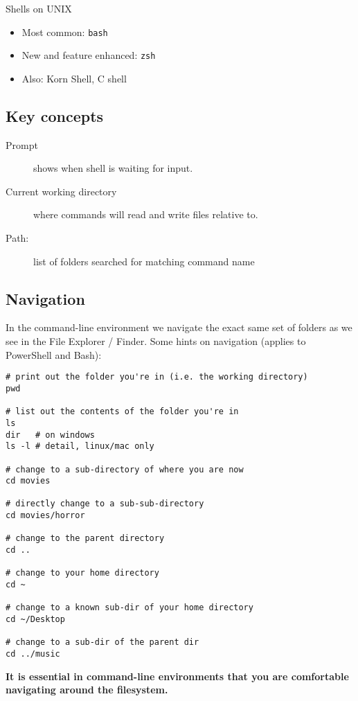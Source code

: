 \documentclass[slides]{pgnotes}
\begin{document}
\begin{bluebox}{Shells on UNIX}
  \begin{itemize}
  \item Most common: \texttt{bash}
  \item New and feature enhanced: \texttt{zsh}
  \item Also: Korn Shell, C shell
  \end{itemize}
\end{bluebox}

\subsection{Key concepts}

\begin{description}
\item[Prompt] shows when shell is waiting for input.
\item[Current working directory] where commands will read and write files relative to.
\item[Path:] list of folders searched for matching command name
\end{description}

\subsection{Navigation}

In the command-line environment we navigate the exact same set of folders as we see in the File Explorer / Finder.
Some hints on navigation (applies to PowerShell and Bash):

\begin{verbatim}
# print out the folder you're in (i.e. the working directory)
pwd

# list out the contents of the folder you're in
ls
dir   # on windows
ls -l # detail, linux/mac only

# change to a sub-directory of where you are now
cd movies

# directly change to a sub-sub-directory
cd movies/horror

# change to the parent directory
cd ..

# change to your home directory
cd ~

# change to a known sub-dir of your home directory
cd ~/Desktop

# change to a sub-dir of the parent dir
cd ../music
\end{verbatim}

\textbf{It is essential in command-line environments that you are comfortable navigating around the filesystem.}
\end{document}
